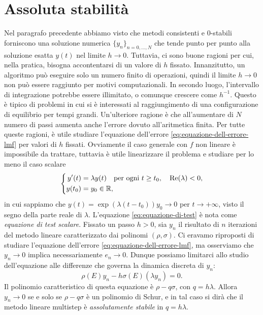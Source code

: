 \section{Assoluta stabilità}
Nel paragrafo precedente abbiamo visto che metodi consistenti e 0-stabili
forniscono una soluzione numerica $\{y_n\}_{n = 0,\dots,N}$ che tende
punto per punto alla soluzione esatta $y(t)$ nel limite $h \to 0$.
Tuttavia, ci sono buone ragioni per cui, nella pratica, bisogna accontentarsi
di un valore di $h$ fissato. Innanzitutto, un algoritmo può eseguire solo
un numero finito di operazioni, quindi il limite $h \to 0$ non può essere
raggiunto per motivi computazionali. In secondo luogo, l'intervallo di
integrazione potrebbe essere illimitato, o comunque crescere come $h^{-1}$.
Questo è tipico di problemi in cui si è interessati al raggiungimento
di una configurazione di equilibrio per tempi grandi. Un'ulteriore ragione
è che all'aumentare di $N$ numero di passi aumenta anche l'errore dovuto
all'aritmetica finita. Per tutte queste ragioni, è utile studiare l'equazione
dell'errore \eqref{eq:equazione-dell-errore-lmf} per valori di $h$ fissati.
Ovviamente il caso generale con $f$ non lineare è impossibile da trattare,
tuttavia è utile linearizzare il problema e studiare per lo meno il caso scalare
\begin{equation}\label{eq:equazione-di-test}
\left\{
\begin{aligned}
y'(t)  &= \lambda y(t) \quad \text{per ogni $t \geq t_0, \quad \operatorname{Re}(\lambda) < 0$}, \\
y(t_0) &= y_0 \in \mathbb{R},
\end{aligned}
\right.
\end{equation}
in cui sappiamo che $y(t) = \exp(\lambda(t-t_0))y_0 \to 0$ per $t \to +\infty$,
visto il segno della parte reale di $\lambda$. L'equazione \eqref{eq:equazione-di-test}
è nota come \emph{equazione di test scalare}. Fissato un passo $h > 0$, sia
$y_n$ il risultato di $n$ iterazioni del metodo lineare caratterizzato dai
polinomi $(\rho,\sigma)$. Ci eravamo riproposti di studiare l'equazione
dell'errore \eqref{eq:equazione-dell-errore-lmf}, ma osserviamo che $y_n \to 0$
implica necessariamente $e_n \to 0$. Dunque possiamo limitarci allo studio
dell'equazione alle differenze che governa la dinamica discreta di $y_n$:
\[
\rho(E) y_n - h \sigma(E) (\lambda y_n) = 0.
\]
Il polinomio caratteristico di questa equazione è $\rho - q\sigma$,
con $q = h\lambda$.
Allora $y_n \to 0$ se e solo se $\rho - q \sigma$ è un polinomio di Schur,
e in tal caso si dirà che il metodo lineare multistep è \emph{assolutamente
stabile} in $q = h\lambda$.

